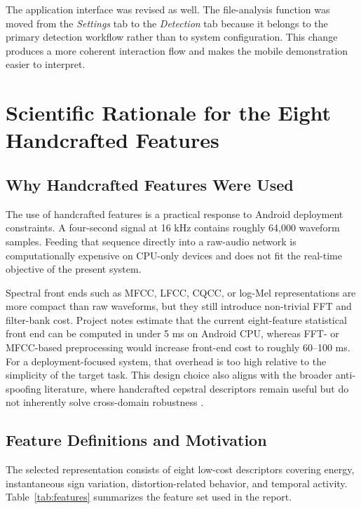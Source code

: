 \documentclass[pdflatex,sn-mathphys-num]{sn-jnl}
\begin{document}
The application interface was revised as well. The file-analysis function was moved from the \textit{Settings} tab to the \textit{Detection} tab because it belongs to the primary detection workflow rather than to system configuration. This change produces a more coherent interaction flow and makes the mobile demonstration easier to interpret.

\section{Scientific Rationale for the Eight Handcrafted Features}\label{sec:features}

\subsection{Why Handcrafted Features Were Used}

The use of handcrafted features is a practical response to Android deployment constraints. A four-second signal at 16 kHz contains roughly 64{,}000 waveform samples. Feeding that sequence directly into a raw-audio network is computationally expensive on CPU-only devices and does not fit the real-time objective of the present system.

Spectral front ends such as MFCC, LFCC, CQCC, or log-Mel representations are more compact than raw waveforms, but they still introduce non-trivial FFT and filter-bank cost. Project notes estimate that the current eight-feature statistical front end can be computed in under 5 ms on Android CPU, whereas FFT- or MFCC-based preprocessing would increase front-end cost to roughly 60--100 ms. For a deployment-focused system, that overhead is too high relative to the simplicity of the target task. This design choice also aligns with the broader anti-spoofing literature, where handcrafted cepstral descriptors remain useful but do not inherently solve cross-domain robustness \cite{todisco2016cqcc}.

\subsection{Feature Definitions and Motivation}

The selected representation consists of eight low-cost descriptors covering energy, instantaneous sign variation, distortion-related behavior, and temporal activity. Table~\ref{tab:features} summarizes the feature set used in the report.
\end{document}

